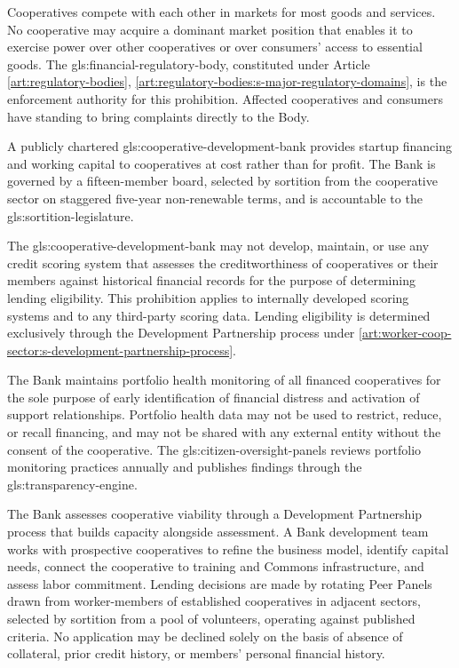 Cooperatives compete with each other in markets for most goods and services. No cooperative may acquire a dominant market position that enables it to exercise power over other cooperatives or over consumers' access to essential goods. The \gls{gls:financial-regulatory-body}, constituted under Article \ref{art:regulatory-bodies}, \ref{art:regulatory-bodies:s-major-regulatory-domains}, is the enforcement authority for this prohibition. Affected cooperatives and consumers have standing to bring complaints directly to the Body.

A publicly chartered \gls{gls:cooperative-development-bank} provides startup financing and working capital to cooperatives at cost rather than for profit. The Bank is governed by a fifteen-member board, selected by sortition from the cooperative sector on staggered five-year non-renewable terms, and is accountable to the \gls{gls:sortition-legislature}.

The \gls{gls:cooperative-development-bank} may not develop, maintain, or use any credit scoring system that assesses the creditworthiness of cooperatives or their members against historical financial records for the purpose of determining lending eligibility. This prohibition applies to internally developed scoring systems and to any third-party scoring data. Lending eligibility is determined exclusively through the Development Partnership process under \ref{art:worker-coop-sector:s-development-partnership-process}.

The Bank maintains portfolio health monitoring of all financed cooperatives for the sole purpose of early identification of financial distress and activation of support relationships. Portfolio health data may not be used to restrict, reduce, or recall financing, and may not be shared with any external entity without the consent of the cooperative. The \gls{gls:citizen-oversight-panels} reviews portfolio monitoring practices annually and publishes findings through the \gls{gls:transparency-engine}.

The Bank assesses cooperative viability through a Development Partnership process that builds capacity alongside assessment. A Bank development team works with prospective cooperatives to refine the business model, identify capital needs, connect the cooperative to training and Commons infrastructure, and assess labor commitment. Lending decisions are made by rotating Peer Panels drawn from worker-members of established cooperatives in adjacent sectors, selected by sortition from a pool of volunteers, operating against published criteria. No application may be declined solely on the basis of absence of collateral, prior credit history, or members' personal financial history.

